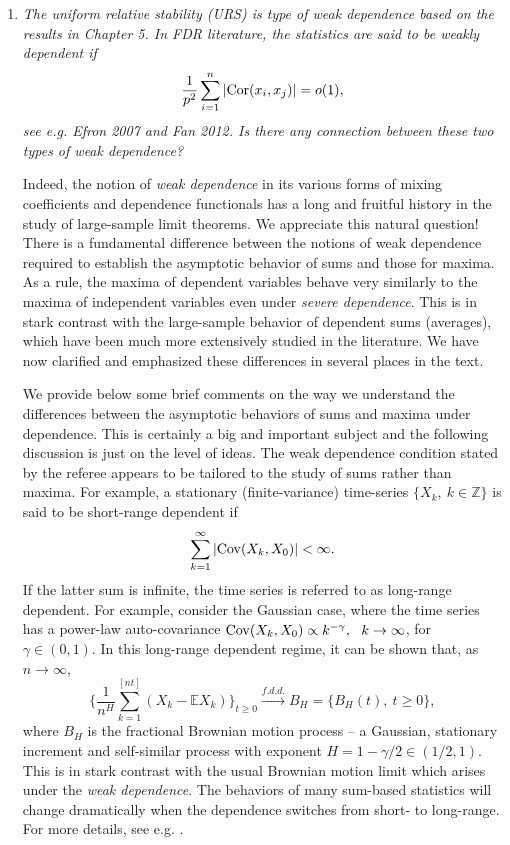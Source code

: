 \documentclass[11pt]{article}
\begin{document}
\begin{enumerate}
        
        \item {\em The uniform relative stability (URS) is type of weak dependence based on the results in Chapter 5. In FDR literature, the statistics are 
        said to be weakly dependent if 
        $$
        \frac{1}{p^2} \sum_{i=1}^n |{\rm Cor}(x_i,x_j)| = o(1),
        $$
see e.g. Efron 2007 and Fan 2012. Is there any connection between these two types of weak dependence?}

   \medskip
   \noindent Indeed, the notion of {\em weak dependence} in its various forms of mixing coefficients and dependence functionals
    has a long and fruitful history in the study of large-sample limit theorems.  We appreciate this natural question!  There is a fundamental 
    difference between the notions of weak dependence required to establish the asymptotic behavior of sums and those for maxima.     
    As a rule, the maxima of dependent variables behave
   very similarly to the maxima of independent variables even under {\em severe dependence}.  This is in stark contrast with the large-sample 
   behavior of dependent sums (averages), which have been much more extensively studied in the literature.  We have now
    clarified and emphasized these differences in several places in the text. 
    
    We provide below some brief comments on the way we understand the differences between the asymptotic behaviors of sums and maxima 
    under dependence.  This is certainly a big and important subject and the following discussion is just on the level of ideas.
    The weak dependence condition stated by the referee appears to be tailored to the study of sums rather than maxima.  For example, a 
    stationary (finite-variance) time-series $\{X_k,\ k\in \mathbb Z\}$ is said to be short-range dependent if
   $$
   \sum_{k=1}^\infty |{\rm Cov} (X_{k}, X_0) | <\infty.
   $$
   If the latter sum is infinite, the time series is referred to as long-range dependent. For example, consider the Gaussian case, where
   the time series has a power-law auto-covariance ${\rm Cov}(X_{k}, X_0) \propto k^{-\gamma},\ \ k\to\infty$, for $\gamma \in (0,1)$.  In this long-range
   dependent regime, it can be shown that, as $n\to\infty$,
  $$
  \Big\{ \frac{1}{n^H} \sum_{k=1}^{[nt]} (X_k -\mathbb E X_k) \Big\}_{t\ge 0} \stackrel{f.d.d.}{\longrightarrow} B_H = \{B_H(t),\ t\ge 0\},
  $$   
  where $B_H$ is the fractional Brownian motion process -- a Gaussian, stationary increment and  self-similar process with 
  exponent $H = 1 - \gamma/2 \in (1/2,1)$.  This is in stark contrast with the usual Brownian motion limit which arises 
  under the {\em weak dependence}.  The behaviors of many sum-based statistics will change dramatically when the dependence switches from
  short- to long-range.  For more details, see e.g. \cite{----}.
  

\end{enumerate}
\end{document}
